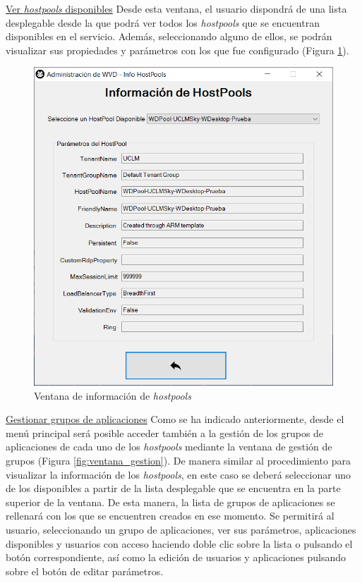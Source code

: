 \clearpage

\noindent\underline{Ver \textit{hostpools} disponibles}\newline
\indent Desde esta ventana, el usuario dispondrá de una lista desplegable desde la que podrá ver todos los \textit{hostpools} que se encuentran disponibles en el servicio. Además, seleccionando alguno de ellos, se podrán visualizar sus propiedades y parámetros con los que fue configurado (Figura \ref{fig:info_hostpools}).

\begin{figure}[h]
  \centering
  \includegraphics[width=0.7\linewidth]{figures/images/script/info_hostpools.PNG}
  \caption{Ventana de información de \textit{hostpools}}
  \label{fig:info_hostpools}
\end{figure}

\clearpage

\noindent\underline{Gestionar grupos de aplicaciones}\newline
\indent Como se ha indicado anteriormente, desde el menú principal será posible acceder también a la gestión de los grupos de aplicaciones de cada uno de los \textit{hostpools} mediante la ventana de gestión de grupos (Figura \ref{fig:ventana_gestion}). De manera similar al procedimiento para visualizar la información de los \textit{hostpools}, en este caso se deberá seleccionar uno de los disponibles a partir de la lista desplegable que se encuentra en la parte superior de la ventana. De esta manera, la lista de grupos de aplicaciones se rellenará con los que se encuentren creados en ese momento. Se permitirá al usuario, seleccionando un grupo de aplicaciones, ver sus parámetros, aplicaciones disponibles y usuarios con acceso haciendo doble clic sobre la lista o pulsando el botón correspondiente, así como la edición de usuarios y aplicaciones pulsando sobre el botón de editar parámetros.

